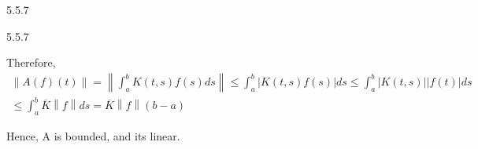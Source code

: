 \documentclass[a4paper,norsk]{article}
\renewcommand{\leq}{\leqslant}
\begin{document}
\begin{oppgavebox}{5.5.7}{}
\begin{proofbox}{5.5.7}{}
\begin{itemize}
        Therefore, 
        \begin{align*}
            \left\lVert A(f)(t) \right\rVert = \left\lVert \int_{a}^{b} K(t, s) f(s) ds  \right\rVert \leq \int_{a}^{b} \left| K(t, s) f(s) \right|  ds \leq \int_{a}^{b} \left| K(t, s) \right| \left| f(t) \right| ds \\
            \leq \int_{a}^{b} \overline{K} \left\lVert f \right\rVert ds = \overline{K} \left\lVert f \right\rVert \left( b-a \right)  
        \end{align*}


        Hence, A is bounded, and its linear.
        
        
    \end{itemize} 
\end{proofbox}
\end{oppgavebox}
\end{document}
